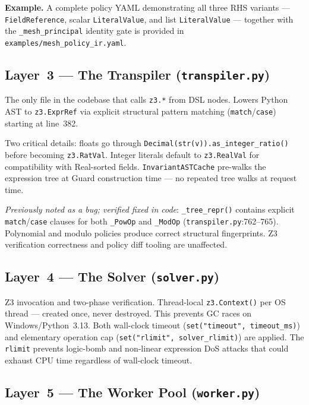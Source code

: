 \documentclass[12pt,a4paper,oneside]{report}
\newcommand{\fname}[1]{\texttt{#1}}          %
\newcommand{\code}[1]{\texttt{#1}}           %
\begin{document}
\textbf{Example.}  A complete policy YAML demonstrating all three RHS
variants --- \code{FieldReference}, scalar \code{LiteralValue}, and list
\code{LiteralValue} --- together with the \code{\_mesh\_principal} identity
gate is provided in \fname{examples/mesh\_policy\_ir.yaml}.

\subsection{Layer~3 --- The Transpiler (\fname{transpiler.py})}

The only file in the codebase that calls \code{z3.*} from DSL nodes. Lowers
Python AST to \code{z3.ExprRef} via explicit structural pattern matching
(\code{match}/\code{case}) starting at line~382.

Two critical details: floats go through \code{Decimal(str(v)).as\_integer\_ratio()}
before becoming \code{z3.RatVal}. Integer literals default to \code{z3.RealVal}
for compatibility with Real-sorted fields. \code{InvariantASTCache} pre-walks
the expression tree at Guard construction time --- no repeated tree walks at
request time.

\textit{Previously noted as a bug; verified fixed in code}: \code{\_tree\_repr()}
contains explicit \code{match}/\code{case} clauses for both \code{\_PowOp}
and \code{\_ModOp} (\fname{transpiler.py}:762--765). Polynomial and modulo
policies produce correct structural fingerprints. Z3 verification correctness
and policy diff tooling are unaffected.

\subsection{Layer~4 --- The Solver (\fname{solver.py})}

Z3 invocation and two-phase verification. Thread-local \code{z3.Context()} per
OS thread --- created once, never destroyed. This prevents GC races on
Windows/Python~3.13. Both wall-clock timeout
(\code{set("timeout", timeout\_ms)}) and elementary operation cap
(\code{set("rlimit", solver\_rlimit)}) are applied. The \code{rlimit} prevents
logic-bomb and non-linear expression DoS attacks that could exhaust CPU time
regardless of wall-clock timeout.

\subsection{Layer~5 --- The Worker Pool (\fname{worker.py})}
\end{document}
